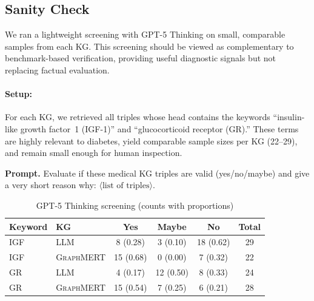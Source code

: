 \documentclass[10pt]{article}
\newcommand{\ours}{\textsc{GraphMERT}\xspace}
\begin{document}
\begin{appendices}
\subsection{Sanity Check} 
We ran a lightweight screening with GPT-5 Thinking on small, comparable samples from each KG. This screening should be viewed as complementary to benchmark-based verification, providing useful diagnostic signals but not replacing factual evaluation. \\

\paragraph{Setup:} For each KG, we retrieved all triples whose head contains the keywords “insulin-like growth factor~1 (IGF-1)” and “glucocorticoid receptor (GR).” These terms are highly relevant to diabetes, yield comparable sample sizes per KG (22--29), and remain small enough for human inspection.
\begin{tcolorbox}[enhanced,breakable,colback=gray!5,colframe=gray!40,
                  left=6pt,right=6pt,top=6pt,bottom=6pt,boxsep=0pt]
\noindent\textbf{Prompt.} Evaluate if these medical KG triples are valid (yes/no/maybe) and give a very short reason why: $\langle\text{list of triples}\rangle$.
\end{tcolorbox}


\begin{table}[t!]
\centering
\caption{GPT-5 Thinking screening (counts with proportions)}
\label{tab:appendix_screening}
\small
{}
\begin{tabular}{l l c c c c}
\toprule
\rowcolor{gray!30}
\textbf{Keyword} & \textbf{KG} & \textbf{Yes} & \textbf{Maybe} & \textbf{No} & \textbf{Total} \\
\midrule
IGF\textendash 1 & LLM    & 8  (0.28) & 3 (0.10)  & 18 (0.62) & 29 \\
IGF\textendash 1 & \ours  & 15 (0.68) & 0 (0.00)  & 7 (0.32)  & 22 \\
\midrule
GR               & LLM    & 4  (0.17) & 12 (0.50) & 8  (0.33) & 24 \\
GR               & \ours  & 15 (0.54) & 7 (0.25)  & 6 (0.21)  & 28 \\
\bottomrule
\end{tabular}
\end{table}


\end{appendices}
\end{document}
